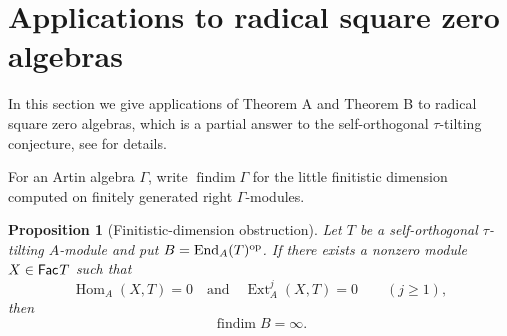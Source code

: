 \documentclass[a4paper,reqno]{amsart}
\newtheorem{proposition}[theorem]{Proposition}
\theoremstyle{definition}
\newcommand{\Ext}{\operatorname{Ext}\nolimits}
\newcommand{\Hom}{\operatorname{Hom}\nolimits}
\newcommand{\End}{\operatorname{End}\nolimits}
\newcommand{\Fac}{\mathsf{Fac}\hspace{.01in}}
\newcommand{\findim}{\operatorname{findim}\nolimits}
\numberwithin{equation}{section}
\begin{document}
\section{Applications to radical square zero algebras}

In this section we give applications of Theorem A and Theorem B to radical square zero algebras, which is a partial answer to the self-orthogonal $\tau$-tilting conjecture, see \cite{Zhang, CLZZ} for details.

For an Artin algebra $\Gamma$, write
$\findim\Gamma$ for the little finitistic dimension computed on
finitely generated right $\Gamma$-modules.

\begin{proposition}[Finitistic-dimension obstruction]
\label{prop:findim-obstruction}
Let $T$ be a self-orthogonal $\tau$-tilting $A$-module and put
$B=\End_A(T)^{\rm op}$. If there exists a nonzero module
$X\in\Fac T$ such that
\[
       \Hom_A(X,T)=0
       \quad\text{and}\quad
       \Ext_A^j(X,T)=0\qquad(j\geq1),
\]
then
\[
                    \findim B=\infty.
\]
\end{proposition}
\end{document}
